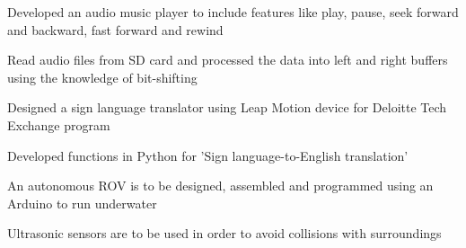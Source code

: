\documentclass[letterpaper, 10pt]{deedy-resume} %
\begin{document}
\begin{minipage}[t]{0.65\textwidth}
\begin{tightitemize}
\item Developed an audio music player to include features like play, pause, seek forward and backward, fast forward and rewind
\item Read audio files from SD card and processed the data into left and right buffers using the knowledge of bit-shifting
\end{tightitemize}
\sectionspace

\begin{tightitemize}
\item Designed a sign language translator using Leap Motion device for Deloitte Tech Exchange program 
\item Developed functions in Python for 'Sign language-to-English translation' 
\end{tightitemize}


\begin{tightitemize}
\item An autonomous ROV is to be designed, assembled and programmed using an Arduino to run underwater
\item Ultrasonic sensors are to be used in order to avoid collisions with surroundings
\end{tightitemize}
\sectionspace %






\end{minipage}
\end{document}
